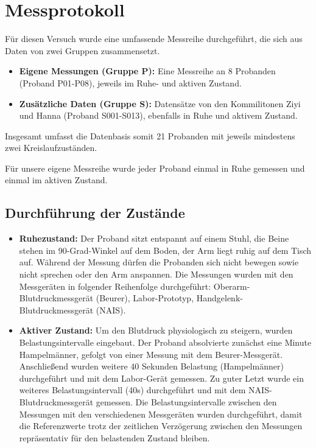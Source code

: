 \documentclass[a4paper, 11pt]{scrartcl}
\begin{document}
\section{Messprotokoll}
Für diesen Versuch wurde eine umfassende Messreihe durchgeführt, die sich aus Daten von zwei Gruppen zusammensetzt. 
\begin{itemize}
    \item \textbf{Eigene Messungen (Gruppe P):} Eine Messreihe an 8 Probanden (Proband P01-P08), jeweils im Ruhe- und aktiven Zustand.
    \item \textbf{Zusätzliche Daten (Gruppe S):} Datensätze von den Kommilitonen Ziyi und Hanna (Proband S001-S013), ebenfalls in Ruhe und aktivem Zustand.
\end{itemize}
Insgesamt umfasst die Datenbasis somit 21 Probanden mit jeweils mindestens zwei Kreislaufzuständen.

Für unsere eigene Messreihe wurde jeder Proband einmal in Ruhe gemessen und einmal im aktiven Zustand.

\subsection*{Durchführung der Zustände}
\begin{itemize}
    \item \textbf{Ruhezustand:} Der Proband sitzt entspannt auf einem Stuhl, die Beine stehen im 90-Grad-Winkel auf dem Boden, der Arm liegt ruhig auf dem Tisch auf. Während der Messung dürfen die Probanden sich nicht bewegen sowie nicht sprechen oder den Arm anspannen. Die Messungen wurden mit den Messgeräten in folgender Reihenfolge durchgeführt: Oberarm-Blutdruckmessgerät (Beurer), Labor-Prototyp, Handgelenk-Blutdruckmessgerät (NAIS).
    \item \textbf{Aktiver Zustand:} Um den Blutdruck physiologisch zu steigern, wurden Belastungsintervalle eingebaut. Der Proband absolvierte zunächst eine Minute Hampelmänner, gefolgt von einer Messung mit dem Beurer-Messgerät. Anschließend wurden weitere 40 Sekunden Belastung (Hampelmänner) durchgeführt und mit dem Labor-Gerät gemessen. Zu guter Letzt wurde ein weiteres Belastungsintervall (40s) durchgeführt und mit dem NAIS-Blutdruckmessgerät gemessen. Die Belastungsintervalle zwischen den Messungen mit den verschiedenen Messgeräten wurden durchgeführt, damit die Referenzwerte trotz der zeitlichen Verzögerung zwischen den Messungen repräsentativ für den belastenden Zustand bleiben.
\end{itemize}
\end{document}
